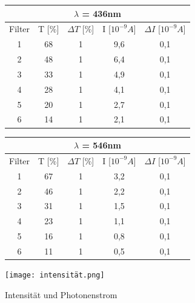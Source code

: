 \documentclass{scrartcl}
\begin{document}
		\begin{figure}[H]
			\begin{center}
				\begin{tabular}{|c|c|c|c|c|}
					\hline
						\multicolumn{5}{|c|}{$\lambda$ = 436nm} \\
					\hline
					Filter & T [\%] & $\Delta T$ [\%] & I [$10^{-9}A$] & $\Delta I$ [$10^{-9}A$]\\
					\hline
					1 & 68 & 1 & 9,6 & 0,1\\
					2 & 48 & 1 & 6,4 & 0,1\\
					3 & 33 & 1 & 4,9 & 0,1\\
					4 & 28 & 1 & 4,1 & 0,1\\
					5 & 20 & 1 & 2,7 & 0,1\\
					6 & 14 & 1 & 2,1 & 0,1\\
					\hline
				\end{tabular}
			\end{center}
		\end{figure}
		\begin{figure}[H]
			\begin{center}
				\begin{tabular}{|c|c|c|c|c|}
					\hline
						\multicolumn{5}{|c|}{$\lambda$ = 546nm} \\
					\hline
					Filter & T [\%] & $\Delta T$ [\%] & I [$10^{-9}A$] & $\Delta I$ [$10^{-9}A$]\\
					\hline
					1 & 67 & 1 & 3,2 & 0,1\\
					2 & 46 & 1 & 2,2 & 0,1\\
					3 & 31 & 1 & 1,5 & 0,1\\
					4 & 23 & 1 & 1,1 & 0,1\\
					5 & 16 & 1 & 0,8 & 0,1\\
					6 & 11 & 1 & 0,5 & 0,1\\
					\hline
				\end{tabular}
			\end{center}
		\end{figure}

		\begin{figure}[H]
			\centering
			\texttt{[image: intensität.png]}
			\caption{Intensität und Photonenstrom}
		\end{figure}
\end{document}
